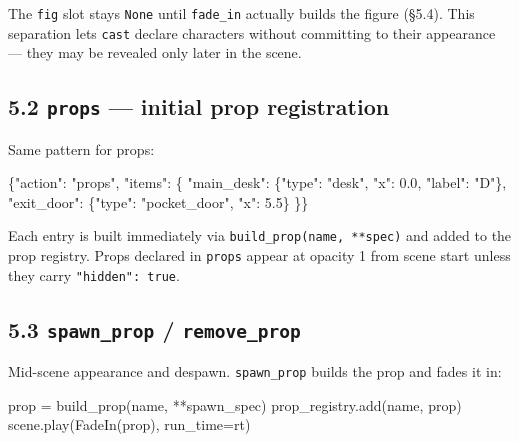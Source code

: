 \documentclass[
  11pt,
]{book}
\newenvironment{Shaded}{}{}
\newcommand{\FloatTok}[1]{\textcolor[rgb]{0.25,0.63,0.44}{#1}}
\newcommand{\NormalTok}[1]{#1}
\newcommand{\OperatorTok}[1]{\textcolor[rgb]{0.40,0.40,0.40}{#1}}
\newcommand{\StringTok}[1]{\textcolor[rgb]{0.25,0.44,0.63}{#1}}
\begin{document}
The \texttt{fig} slot stays \texttt{None} until \texttt{fade\_in}
actually builds the figure (§5.4). This separation lets \texttt{cast}
declare characters without committing to their appearance --- they may
be revealed only later in the scene.

\subsection{\texorpdfstring{5.2 \texttt{props} --- initial prop
registration}{5.2 props --- initial prop registration}}\label{props-initial-prop-registration}

Same pattern for props:

\begin{Shaded}
\begin{Highlighting}[]
\NormalTok{\{}\StringTok{"action"}\NormalTok{: }\StringTok{"props"}\NormalTok{, }\StringTok{"items"}\NormalTok{: \{}
  \StringTok{"main\_desk"}\NormalTok{: \{}\StringTok{"type"}\NormalTok{: }\StringTok{"desk"}\NormalTok{, }\StringTok{"x"}\NormalTok{: }\FloatTok{0.0}\NormalTok{, }\StringTok{"label"}\NormalTok{: }\StringTok{"D"}\NormalTok{\},}
  \StringTok{"exit\_door"}\NormalTok{: \{}\StringTok{"type"}\NormalTok{: }\StringTok{"pocket\_door"}\NormalTok{, }\StringTok{"x"}\NormalTok{: }\FloatTok{5.5}\NormalTok{\}}
\NormalTok{\}\}}
\end{Highlighting}
\end{Shaded}

Each entry is built immediately via \texttt{build\_prop(name,\ **spec)}
and added to the prop registry. Props declared in \texttt{props} appear
at opacity 1 from scene start unless they carry
\texttt{"hidden":\ true}.

\subsection{\texorpdfstring{5.3 \texttt{spawn\_prop} /
\texttt{remove\_prop}}{5.3 spawn\_prop / remove\_prop}}\label{spawn_prop-remove_prop}

Mid-scene appearance and despawn. \texttt{spawn\_prop} builds the prop
and fades it in:

\begin{Shaded}
\begin{Highlighting}[]
\NormalTok{prop }\OperatorTok{=}\NormalTok{ build\_prop(name, }\OperatorTok{**}\NormalTok{spawn\_spec)}
\NormalTok{prop\_registry.add(name, prop)}
\NormalTok{scene.play(FadeIn(prop), run\_time}\OperatorTok{=}\NormalTok{rt)}
\end{Highlighting}
\end{Shaded}
\end{document}
